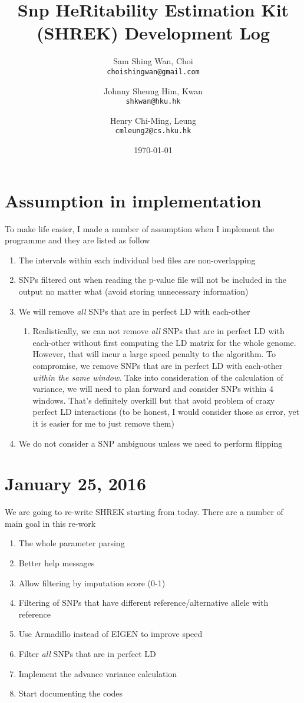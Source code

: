 \documentclass[12pt]{article}
\title{Snp HeRitability Estimation Kit (SHREK) Development Log}
\date{\today}
\author{Sam Shing Wan, Choi\\ 
	\texttt{choishingwan@gmail.com}
	\and
	Johnny Sheung Him, Kwan\\
	\texttt{shkwan@hku.hk}
	\and
	Henry Chi-Ming, Leung\\
	\texttt{cmleung2@cs.hku.hk}
}
\begin{document}
	
	\maketitle
	\tableofcontents
	
	\section*{Assumption in implementation}
	To make life easier, I made a number of assumption when I implement the programme and they are listed as follow
	\begin{enumerate}
		\item The intervals within each individual bed files are non-overlapping
		\item SNPs filtered out when reading the p-value file will not be included in the output no matter what (avoid storing unnecessary information)
		\item We will remove \emph{all} SNPs that are in perfect LD with each-other
		\begin{enumerate}
			\item Realistically, we can not remove \emph{all} SNPs that are in perfect LD with each-other without first computing the LD matrix for the whole genome. 
			However, that will incur a large speed penalty to the algorithm.
			To compromise, we remove SNPs that are in perfect LD with each-other \emph{within the same window}.
			Take into consideration of the calculation of variance, we will need to plan forward and consider SNPs within 4 windows. 
			That's definitely overkill but that avoid problem of crazy perfect LD interactions (to be honest, I would consider those as error, yet it is easier for me to just remove them)
		\end{enumerate}
		\item We do not consider a SNP ambiguous unless we need to perform flipping
	\end{enumerate}
	
	\section*{January 25, 2016}
	We are going to re-write SHREK starting from today. 
	There are a number of main goal in this re-work
	\begin{enumerate}
		\item The whole parameter parsing 
		\item Better help messages
		\item Allow filtering by imputation score (0-1)
		\item Filtering of SNPs that have different reference/alternative allele with reference
		\item Use Armadillo instead of EIGEN to improve speed
		\item Filter \emph{all} SNPs that are in perfect LD
		\item Implement the advance variance calculation 
		\item Start documenting the codes
	\end{enumerate}
\end{document}
